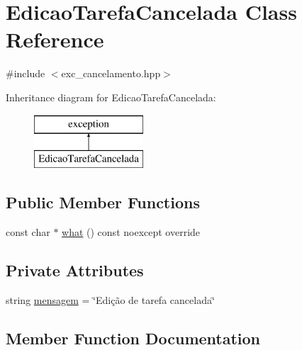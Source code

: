 \hypertarget{classEdicaoTarefaCancelada}{}\section{Edicao\+Tarefa\+Cancelada Class Reference}
\label{classEdicaoTarefaCancelada}


{\ttfamily \#include $<$exc\+\_\+cancelamento.\+hpp$>$}

Inheritance diagram for Edicao\+Tarefa\+Cancelada\+:\begin{figure}[H]
\begin{center}
\leavevmode
\includegraphics[height=2.000000cm]{classEdicaoTarefaCancelada}
\end{center}
\end{figure}
\subsection*{Public Member Functions}
\begin{DoxyCompactItemize}
\item 
const char $\ast$ \hyperlink{classEdicaoTarefaCancelada_a29a5052c938b209eddb78b9dc1200122}{what} () const noexcept override
\end{DoxyCompactItemize}
\subsection*{Private Attributes}
\begin{DoxyCompactItemize}
\item 
string \hyperlink{classEdicaoTarefaCancelada_a9b2145786ee5d1969d5f7703f6e4fb60}{mensagem} = \char`\"{}Edição de tarefa cancelada\char`\"{}
\end{DoxyCompactItemize}


\subsection{Member Function Documentation}
\mbox{\label{classEdicaoTarefaCancelada_a29a5052c938b209eddb78b9dc1200122}} 
